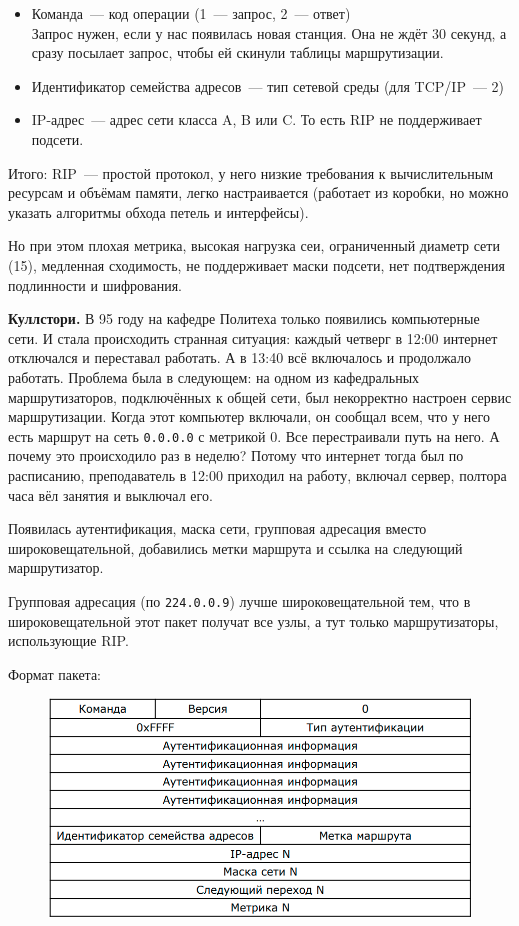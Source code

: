 \begin{itemize}
    \item Команда~--- код операции (1~--- запрос, 2~--- ответ)\\
    Запрос нужен, если у нас появилась новая станция. Она не ждёт 30 секунд, а сразу посылает запрос, чтобы ей скинули таблицы маршрутизации.
    \item Идентификатор семейства адресов~--- тип сетевой среды (для TCP/IP~--- 2)
    \item IP-адрес~--- адрес сети класса A, B или C. То есть RIP не поддерживает подсети.
\end{itemize}

Итого: RIP~--- простой протокол, у него низкие требования к вычислительным ресурсам и объёмам памяти, легко настраивается (работает из коробки, но можно указать алгоритмы обхода петель и интерфейсы).

Но при этом плохая метрика, высокая нагрузка сеи, ограниченный диаметр сети (15), медленная сходимость, не поддерживает маски подсети, нет подтверждения подлинности и шифрования.

{\bf Куллстори.} В 95 году на кафедре Политеха только появились компьютерные сети. И стала происходить странная ситуация: каждый четверг в 12:00 интернет отключался и переставал работать. А в 13:40 всё включалось и продолжало работать. Проблема была в следующем: на одном из кафедральных маршрутизаторов, подключённых к общей сети, был некорректно настроен сервис маршрутизации. Когда этот компьютер включали, он сообщал всем, что у него есть маршрут на сеть {\tt 0.0.0.0} с метрикой 0. Все перестраивали путь на него. А почему это происходило раз в неделю? Потому что интернет тогда был по расписанию, преподаватель в 12:00 приходил на работу, включал сервер, полтора часа вёл занятия и выключал его.


Появилась аутентификация, маска сети, групповая адресация вместо широковещательной, добавились метки маршрута и ссылка на следующий маршрутизатор.

Групповая адресация (по {\tt 224.0.0.9}) лучше широковещательной тем, что в широковещательной этот пакет получат все узлы, а тут только маршрутизаторы, использующие RIP.

Формат пакета:

\begin{figure}[H]
  \centering
  \includegraphics[width=15cm]{images/04/08}
\end{figure}

